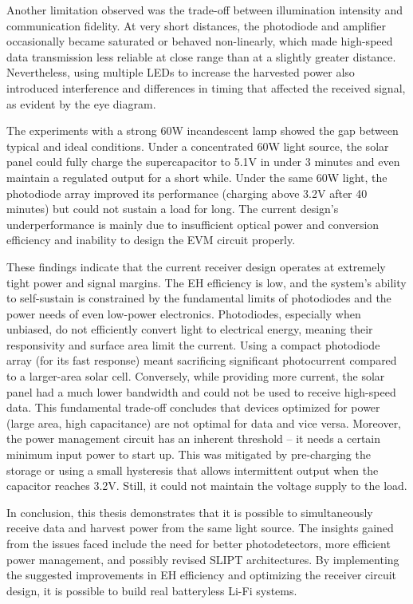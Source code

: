 Another limitation observed was the trade-off between illumination intensity and communication fidelity. At very short distances, the photodiode and amplifier occasionally became saturated or behaved non-linearly, which made high-speed data transmission less reliable at close range than at a slightly greater distance. Nevertheless, using multiple LEDs to increase the harvested power also introduced interference and differences in timing that affected the received signal, as evident by the eye diagram. 

The experiments with a strong 60W incandescent lamp showed the gap between typical and ideal conditions. Under a concentrated 60W light source, the solar panel could fully charge the supercapacitor to 5.1V in under 3 minutes and even maintain a regulated output for a short while. Under the same 60W light, the photodiode array improved its performance (charging above 3.2V after 40 minutes) but could not sustain a load for long. The current design’s underperformance is mainly due to insufficient optical power and conversion efficiency and inability to design the \ac{EVM} circuit properly.

These findings indicate that the current receiver design operates at extremely tight power and signal margins. The \ac{EH} efficiency is low, and the system’s ability to self-sustain is constrained by the fundamental limits of photodiodes and the power needs of even low-power electronics. Photodiodes, especially when unbiased, do not efficiently convert light to electrical energy, meaning their responsivity and surface area limit the current. Using a compact photodiode array (for its fast response) meant sacrificing significant photocurrent compared to a larger-area solar cell. Conversely, while providing more current, the solar panel had a much lower bandwidth and could not be used to receive high-speed data. This fundamental trade-off concludes that devices optimized for power (large area, high capacitance) are not optimal for data and vice versa. Moreover, the power management circuit has an inherent threshold – it needs a certain minimum input power to start up. This was mitigated by pre-charging the storage or using a small hysteresis that allows intermittent output when the capacitor reaches 3.2V. Still, it could not maintain the voltage supply to the load.  


In conclusion, this thesis demonstrates that it is possible to simultaneously receive data and harvest power from the same light source. The insights gained from the issues faced include the need for better photodetectors, more efficient power management, and possibly revised \ac{SLIPT} architectures. By implementing the suggested improvements in \ac{EH} efficiency and optimizing the receiver circuit design, it is possible to build real batteryless \ac{Li-Fi} systems.

